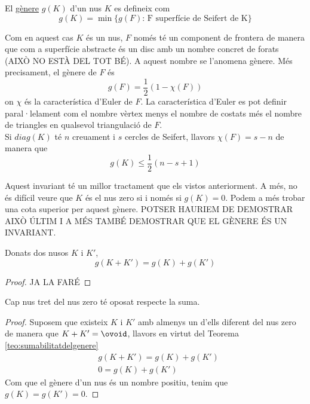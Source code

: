 \begin{definition}\label{def:genere}
	El \underline{gènere} $g(K)$ d'un nus $K$ es defineix com $$g(K)=\min\{g(F) \text{: F superfície de Seifert de K}\}$$
\end{definition}

Com en aquest cas $K$ és un nus, $F$ només té un component de frontera de manera que com a superfície abstracte és un disc amb un nombre concret de forats (AIXÒ NO ESTÀ DEL TOT BÉ). A aquest nombre se l'anomena gènere. Més precisament, el gènere de $F$ és $$g(F)=\frac{1}{2}(1-\mathcal{\chi}(F))$$ on $\mathcal{\chi}$ és la característica d'Euler de $F$. La característica d'Euler es pot definir paral·lelament com el nombre vèrtex menys el nombre de costats més el nombre de triangles en qualsevol triangulació de $F$.\\

Si $diag(K)$ té $n$ creuament i $s$ cercles de Seifert, llavors $\mathcal{\chi}(F)=s-n$ de manera que $$g(K)\leq \frac{1}{2}(n-s+1)$$

Aquest invariant té un millor tractament que els vistos anteriorment. A més, no és difícil veure que $K$ és el nus zero si i només si $g(K)=0$. Podem a més trobar una cota superior per aquest gènere. POTSER HAURIEM DE DEMOSTRAR AIXÒ ÚLTIM I A MÉS TAMBÉ DEMOSTRAR QUE EL GÈNERE ÉS UN INVARIANT.\\

\begin{theorem}\label{teo:sumabilitatdelgenere}
	Donats dos nusos $K$ i $K'$, $$g(K+K')=g(K)+g(K')$$
\end{theorem}

\begin{proof}
	JA LA FARÉ
\end{proof}

\begin{corolary}
	Cap nus tret del nus zero té oposat respecte la suma.
\end{corolary}

\begin{proof}
	Suposem que existeix $K$ i $K'$ amb almenys un d'ells diferent del nus zero de manera que $K+K'=\ovoid$, llavors en virtut del Teorema \ref{teo:sumabilitatdelgenere}
	\begin{align*}
		&g(K+K')=g(K)+g(K')\\
		&0=g(K)+g(K')
	\end{align*}
	Com que el gènere d'un nus és un nombre positiu, tenim que $g(K)=g(K')=0$.
\end{proof}

